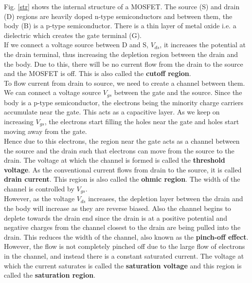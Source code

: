 Fig. \ref{str} shows the internal structure of a MOSFET. The source (S) and drain (D) regions are heavily doped n-type semiconductors and between them, the body (B) is a p-type semiconductor. There is a thin layer of metal oxide i.e. a dielectric which creates the gate terminal (G).\\

If we connect a voltage source between D and S, $V_{ds}$, it increases the potential at the drain terminal, thus increasing the depletion region between the drain and the body. Due to this, there will be no current flow from the drain to the source and the MOSFET is off. This is also called the \textbf{cutoff region}.\\

To flow current from drain to source, we need to create a channel between them. We can connect a voltage source $V_{gs}$ between the gate and the source. Since the body is a p-type semiconductor, the electrons being the minority charge carriers accumulate near the gate. This acts as a capacitive layer. As we keep on increasing $V_{gs}$, the electrons start filling the holes near the gate and holes start moving away from the gate.\\

Hence due to this electrons, the region near the gate acts as a channel between the source and the drain such that electrons can move from the source to the drain. The voltage at which the channel is formed is called the \textbf{threshold voltage}. As the conventional current flows from drain to the source, it is called \textbf{drain current}. This region is also called the \textbf{ohmic region}. The width of the channel is controlled by $V_{gs}$.\\

However, as the voltage $V_{ds}$ increases, the depletion layer between the drain and the body will increase as they are reverse biased. Also the channel begins to deplete towards the drain end since the drain is at a positive potential and negative charges from the channel closest to the drain are being pulled into the drain. This reduces the width of the channel, also known as the \textbf{pinch-off effect}.\\ 

However, the flow is not completely pinched off due to the large flow of electrons in the channel, and instead there is a constant saturated current. The voltage at which the current saturates is called the \textbf{saturation voltage} and this region is called the \textbf{saturation region}.

